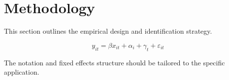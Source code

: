 \section{Methodology} \label{sec:methodology}

This section outlines the empirical design and identification strategy.

\begin{equation} \label{eq:main}
    y_{it} = \beta x_{it} + \alpha_i + \gamma_t + \varepsilon_{it}
\end{equation}

The notation and fixed effects structure should be tailored to the specific application.
